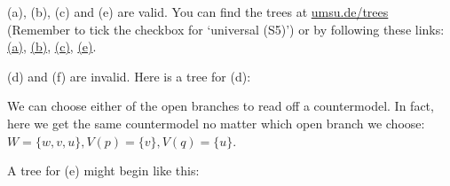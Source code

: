 \begin{solution}
  (a), (b), (c) and (e) are valid. You can find the trees at
  \href{https://www.umsu.de/trees/}{umsu.de/trees} (Remember to tick the checkbox for `universal (S5)') or by following these links:
  \href{https://www.umsu.de/trees/\#p~5~8~9p||universality}{(a)},
\href{https://www.umsu.de/trees/\#~9~9p~5~9p||universality}{(b)},
\href{https://www.umsu.de/trees/\#~9(p~1q)~5(~9p~1~9q)||universality}{(c)},
\href{https://www.umsu.de/trees/\#~9(p~2q)~4(~9p~2~9q)||universality}{(e)}.
  
  (d) and (f) are invalid. Here is a tree for (d):

  \medskip

  \medskip\noindent
  We can choose either of the open branches to read off a countermodel. In fact, here we get the same countermodel no matter which open branch we choose:
$W = \{ w,v,u \}, V(p)=\{ v\}, V(q)=\{u\}$.
  \medskip

  A tree for (e) might begin like this:


\end{solution}
